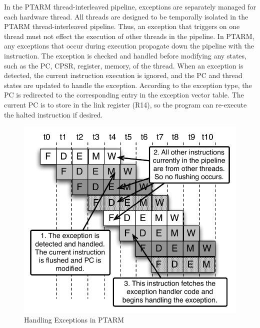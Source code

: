 In the PTARM thread-interleaved pipeline, exceptions are separately managed for each hardware thread.  
All threads are designed to be temporally isolated in the PTARM thread-interleaved pipeline.  
Thus, an exception that triggers on one thread must not effect the execution of other threads in the pipeline.
In PTARM, any exceptions that occur during execution propagate down the pipeline with the instruction.
The exception is checked and handled before modifying any states, such as the PC, CPSR, register, memory, of the thread.  
When an exception is detected, the current instruction execution is ignored, and the PC and thread states are updated to handle the exception.   
According to the exception type, the PC is redirected to the corresponding entry in the exception vector table. 
The current PC is to store in the link register (R14), so the program can re-execute the halted instruction if desired.

\begin{figure}
  \vspace{-30pt}
  \begin{center}
    \includegraphics[scale=.65]{figs/exception_handling_pipeline}
  \end{center}
  \vspace{-3mm}
  \caption{Handling Exceptions in PTARM}
  \label{fig:exception_handling_pipeline}
  \vspace{-10pt}
\end{figure}

